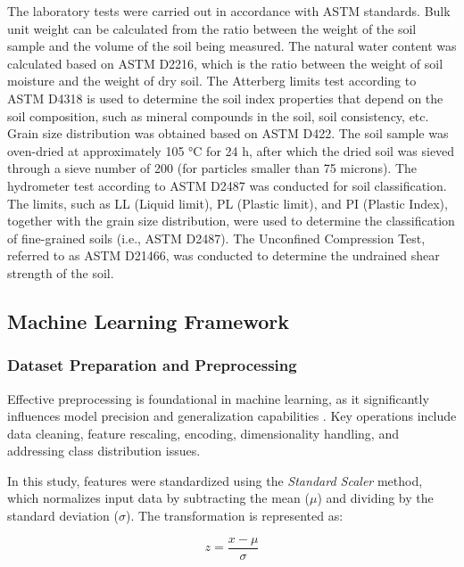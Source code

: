 \documentclass[12pt,a4paper]{article}
\begin{document}
	The laboratory tests were carried out in accordance with ASTM standards. Bulk unit weight can be calculated from the ratio between the weight of the soil sample and the volume of the soil being measured. The natural water content was calculated based on ASTM D2216, which is the ratio between the weight of soil moisture and the weight of dry soil. The Atterberg limits test according to ASTM D4318 is used to determine the soil index properties that depend on the soil composition, such as mineral compounds in the soil, soil consistency, etc. Grain size distribution was obtained based on ASTM D422. The soil sample was oven-dried at approximately 105 °C for 24 h, after which the dried soil was sieved through a sieve number of 200 (for particles smaller than 75 microns). The hydrometer test according to ASTM D2487 was conducted for soil classification. The limits, such as LL (Liquid limit), PL (Plastic limit), and PI (Plastic Index), together with the grain size distribution, were used to determine the classification of fine-grained soils (i.e., ASTM D2487). The Unconfined Compression Test, referred to as ASTM D21466, was conducted to determine the undrained shear strength of the soil.
	
	\subsection{Machine Learning Framework}
	
	\subsubsection{Dataset Preparation and Preprocessing}
	
	\hspace{1.9cm} Effective preprocessing is foundational in machine learning, as it significantly influences model precision and generalization capabilities \cite{kotsiantis2006data, García_Ramírez-Gallego_Luengo_Benítez_Herrera_2016}. Key operations include data cleaning, feature rescaling, encoding, dimensionality handling, and addressing class distribution issues.
	
	\hspace{1.3cm} In this study, features were standardized using the \textit{Standard Scaler} method, which normalizes input data by subtracting the mean ($\mu$) and dividing by the standard deviation ($\sigma$). The transformation is represented as:
	
	\begin{equation}
		z = \frac{x - \mu}{\sigma}
	\end{equation}
	
\end{document}
